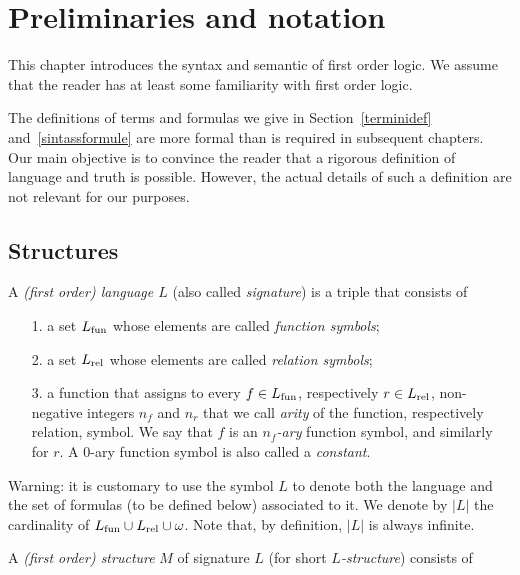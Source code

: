 \chapter{Preliminaries and notation}\label{termini}
This chapter introduces the syntax and semantic of first order logic. We assume that the reader has at least some familiarity with first order logic. 

The definitions of terms and formulas we give in Section~\ref{terminidef} and~\ref{sintassformule} are more formal than is required in subsequent chapters. Our main objective is to convince the reader that a rigorous definition of language and truth is possible. However, the actual details of such a definition are not relevant for our purposes.


\section{Structures}

A \emph{(first order) language $L$\/}  (also called \emph{signature\/}) is a triple that consists of

\begin{itemize}
\item[1.] a set \emph{$L_{\rm fun}$} whose elements are called \emph{function symbols};
\item[2.] a set \emph{$L_{\rm rel}$\/} whose elements are called \emph{relation symbols};
\item[3.] a function that assigns to every $f\in L_{\rm fun}$, respectively $r\in L_{\rm rel}$, non-negative integers $n_f$ and $n_r$ that we call \emph{arity\/} of the function, respectively relation, symbol. We say that $f$ is an \emph{$n_f$-ary} function symbol, and similarly for $r$. A $0$-ary function symbol is also called a \emph{constant\/}.
\end{itemize}

Warning: it is customary to use the symbol \emph{$L$} to denote both the language and the set of formulas (to be defined below) associated to it. We denote by \emph{$|L|$} the cardinality of $L_{\rm fun}\cup L_{\rm rel}\cup\omega$. Note that, by definition, $|L|$ is always infinite. 

A \emph{(first order) structure\/} $M$ of signature $L$ (for short \emph{$L$-structure}) consists of

